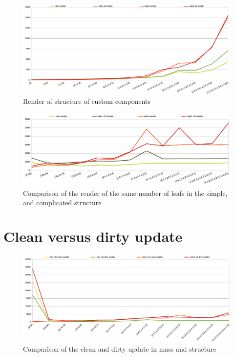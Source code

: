 	\begin{figure}[h]
	\centering  
		\includegraphics[scale=0.5]{images/benchmarks/s_render.png}
		\caption{Render of structure of custom components}
		\label{img:benchmarks-structure-render}
	\end{figure}

	\begin{figure}[h]
	\centering  
		\includegraphics[scale=0.55]{images/benchmarks/mvs_render.png}
		\caption{Comparison of the render of the same number of leafs in the simple, and complicated structure}
		\label{img:benchmarks-mass-vs-structure-render}
	\end{figure}

\section{Clean versus dirty update}\label{sec:benchmarks-clean-vs-dirty-update}

	\begin{figure}[h]
	\centering  
		\includegraphics[scale=0.5]{images/benchmarks/mvs_dirty_vs_clean_update.png}
		\caption{Comparison of the clean and dirty update in mass and structure}
		\label{img:benchmarks-mass-vs-structure-dirty-vs-clean-update}
	\end{figure}


